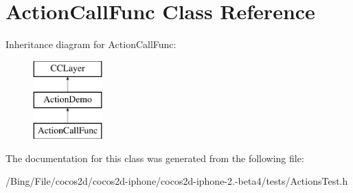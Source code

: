 \hypertarget{interface_action_call_func}{\section{Action\-Call\-Func Class Reference}
\label{interface_action_call_func}
}
Inheritance diagram for Action\-Call\-Func\-:\begin{figure}[H]
\begin{center}
\leavevmode
\includegraphics[height=3.000000cm]{interface_action_call_func}
\end{center}
\end{figure}


The documentation for this class was generated from the following file\-:\begin{DoxyCompactItemize}
\item 
/\-Bing/\-File/cocos2d/cocos2d-\/iphone/cocos2d-\/iphone-\/2.-\/beta4/tests/Actions\-Test.\-h\end{DoxyCompactItemize}
